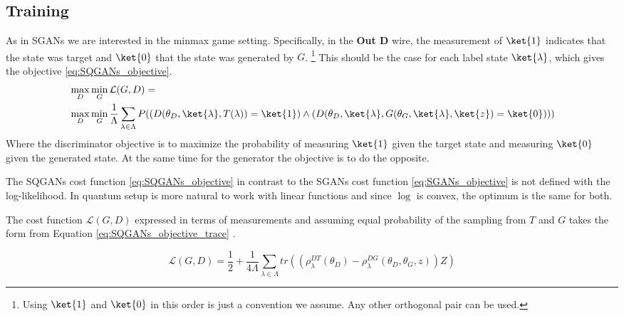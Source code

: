 \subsection{Training}
As in SGANs we are interested in the minmax game setting. Specifically, in
the \textbf{Out D} wire, the measurement of $\ket{1}$ indicates that the state
was target and $\ket{0}$ that the state was generated by $G$.
\footnote{Using $\ket{1}$ and $\ket{0}$ in this order is just a convention we
  assume. Any other orthogonal pair can be used.}
This should be the case for each label state $\ket{\lambda}$, which gives the
objective \eqref{eq:SQGANs_objective}. 
\begin{equation}
  \begin{split}
  \label{eq:SQGANs_objective}
  & \max_{D}\min_{G} \mathcal{L}(G, D) = \\
  & \max_{D}\min_{G}  \frac{1}{\Lambda}\sum_{\lambda \in \Lambda}{P((D(\theta_D, \ket{\lambda}, T(\lambda)) = \ket{1}) \land (D(\theta_D, \ket{\lambda}, G(\theta_G, \ket{\lambda}, \ket{z}) = \ket{0})))}
  \end{split}
\end{equation} 
Where the discriminator objective is to maximize the probability of measuring $\ket{1}$
given the target state and measuring $\ket{0}$ given the generated state. At the same
time for the generator the objective is to do the opposite.

The SQGANs cost function \eqref{eq:SQGANs_objective} in contrast to the SGANs cost
function \eqref{eq:SGANs_objective} is not defined with the log-likelihood. In quantum
setup is more natural to work with linear functions and since $\log$ is
convex, the optimum is the same for both.

The cost function $\mathcal{L}(G, D)$ expressed in terms of measurements and
assuming equal probability of the sampling from $T$ and $G$ takes the form from
Equation \eqref{eq:SQGANs_objective_trace} \cite{Dallaire_Demers_2018}.

\begin{equation}
  \label{eq:SQGANs_objective_trace}
  \mathcal{L}(G, D) = \frac{1}{2} + \frac{1}{4\Lambda}\sum_{\lambda \in
  \Lambda}{}tr((\rho_\lambda^{DT}(\theta_D) - \rho_\lambda^{DG}(\theta_D, \theta_G, z))Z)
\end{equation}

